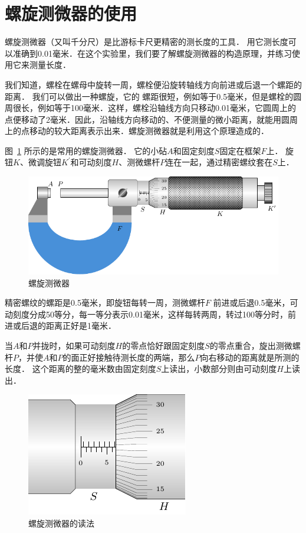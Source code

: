 \section{螺旋测微器的使用}
螺旋测微器（又叫千分尺）是比游标卡尺更精密的测长度的工具．
用它测长度可以准确到0.01毫米．在这个实验里，我们要了解螺旋测微器的构造原理，并练习使用它来测量长度．

我们知道，螺栓在螺母中旋转一周，螺栓便沿旋转轴线方向前进或后退一个螺距的距离．
我们可以做出一种螺旋，它的	
螺距很短，例如等于0.5毫米，但是螺栓的圆周很长，例如等于100毫米．这样，螺栓沿轴线方向只移动0.01毫米，它圆周上的点便移动了2毫米．因此，沿轴线方向移动的、不便测量的微小距离，就能用圆周上的点移动的较大距离表示出来．螺旋测微器就是利用这个原理造成的．


图~\ref{fig_A_10-4} 所示的是常用的螺旋测微器．
它的小砧$A$和固定刻度$S$固定在框架$F$上．
旋钮$K$、微调旋钮$K^{\prime}$和可动刻度$H$、测微螺杆$P$连在一起，通过精密螺纹套在$S$上．

\begin{figure}[htbp]
	\centering
	\includegraphics{fig/A/10-4.pdf}
	\caption{螺旋测微器}\label{fig_A_10-4}
\end{figure}


精密螺纹的螺距是0.5毫米，即旋钮每转一周，测微螺杆$F$ 前进或后退0.5毫米，可动刻度分成50等分，每一等分表示0.01毫米，这样每转两周，转过100等分时，前进或后退的距离正好是1毫米．

当$A$和$P$并拢时，如果可动刻度$H$的零点恰好跟固定刻度$S$的零点重合，旋出测微螺杆$P$，并使$A$和$P$的面正好接触待测长度的两端，那么$P$向右移动的距离就是所测的长度．
这个距离的整的毫米数由固定刻度$S$上读出，小数部分则由可动刻度$H$上读出．
\begin{figure}[htbp]
    \centering
    \includegraphics{fig/A/10-5.pdf}
    \caption{螺旋测微器的读法}\label{fig_A_10-5}
\end{figure}

